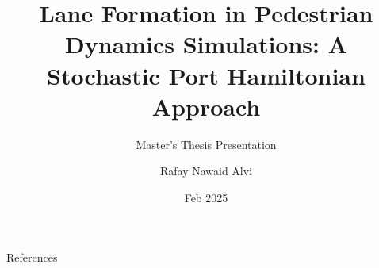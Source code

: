 \documentclass[aspectratio=43]{beamer}
\title{Lane Formation in Pedestrian Dynamics Simulations: A Stochastic Port Hamiltonian Approach}
\subtitle{Master's Thesis Presentation}
\author{Rafay Nawaid Alvi}
\institute{Computer Simulation in Science (CSiS) \\Bergische Universität Wuppertal}
\date{Feb 2025}
\begin{document}
\frame{\titlepage}












\begin{frame}[allowframebreaks]{References}
    \printbibliography
\end{frame}
\end{document}
